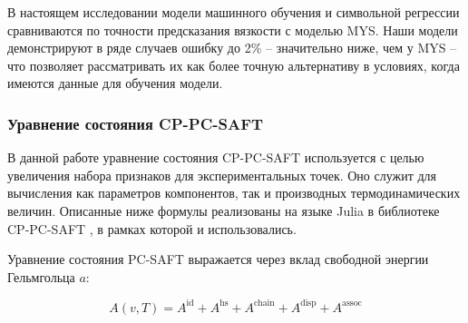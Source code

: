 \documentclass[a4paper,12pt]{article}
\begin{document}
      В настоящем исследовании модели машинного обучения и символьной регрессии сравниваются по точности предсказания вязкости с моделью MYS. Наши модели демонстрируют в ряде случаев ошибку до 2\% -- значительно ниже, чем у MYS -- что позволяет рассматривать их как более точную альтернативу в условиях, когда имеются данные для обучения модели.
      
    \subsubsection{Уравнение состояния CP-PC-SAFT}
    
    В данной работе уравнение состояния CP-PC-SAFT используется с целью увеличения набора признаков для экспериментальных точек. Оно служит для вычисления как параметров компонентов, так и производных термодинамических величин. Описанные ниже формулы реализованы на языке Julia в библиотеке CP-PC-SAFT \cite{CPPCSAFTgitJulia}, в рамках которой и использовались.

    Уравнение состояния PC-SAFT выражается через вклад свободной энергии Гельмгольца \( a \):
    
    \begin{equation}
    A(v, T) = A^{\text{id}} + A^{\text{hs}} + A^{\text{chain}} + A^{\text{disp}} + A^{\text{assoc}}
    \end{equation}
    
\end{document}
